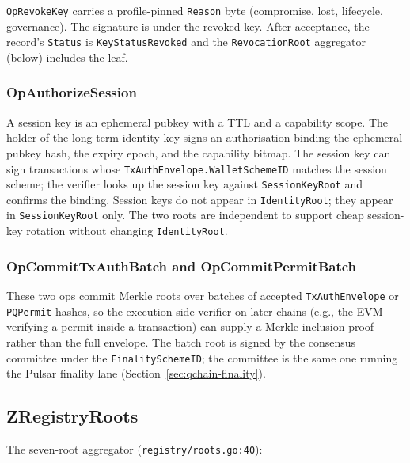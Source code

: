 \texttt{OpRevokeKey} carries a profile-pinned \texttt{Reason} byte
(compromise, lost, lifecycle, governance). The signature is under the
revoked key. After acceptance, the record's \texttt{Status} is
\texttt{KeyStatusRevoked} and the \texttt{RevocationRoot} aggregator (below)
includes the leaf.

\subsubsection{OpAuthorizeSession}

A session key is an ephemeral pubkey with a TTL and a capability scope. The
holder of the long-term identity key signs an authorisation binding the
ephemeral pubkey hash, the expiry epoch, and the capability bitmap. The
session key can sign transactions whose
\texttt{TxAuthEnvelope.WalletSchemeID} matches the session scheme; the
verifier looks up the session key against \texttt{SessionKeyRoot} and
confirms the binding. Session keys do not appear in \texttt{IdentityRoot};
they appear in \texttt{SessionKeyRoot} only. The two roots are independent
to support cheap session-key rotation without changing
\texttt{IdentityRoot}.

\subsubsection{OpCommitTxAuthBatch and OpCommitPermitBatch}

These two ops commit Merkle roots over batches of accepted
\texttt{TxAuthEnvelope} or \texttt{PQPermit} hashes, so the execution-side
verifier on later chains (e.g., the EVM verifying a permit inside a
transaction) can supply a Merkle inclusion proof rather than the full
envelope. The batch root is signed by the consensus committee under the
\texttt{FinalitySchemeID}; the committee is the same one running the
Pulsar finality lane (Section~\ref{sec:qchain-finality}).

\subsection{ZRegistryRoots}

The seven-root aggregator (\texttt{registry/roots.go:40}):


